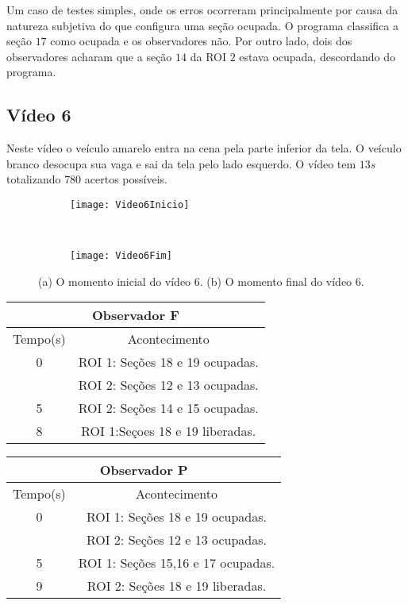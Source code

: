 Um caso de testes simples, onde os erros ocorreram principalmente por causa da natureza subjetiva do que configura uma seção ocupada. O programa classifica a seção $17$ como ocupada e os observadores não. Por outro lado, dois dos observadores acharam que a seção $14$ da ROI $2$ estava ocupada, descordando do programa.

\subsection{Vídeo 6}

Neste vídeo o veículo amarelo entra na cena pela parte inferior da tela. O veículo branco desocupa sua vaga e sai da tela pelo lado esquerdo. O vídeo tem $13s$ totalizando $780$ acertos possíveis.

\begin{figure}[!h]
\centering
\begin{subfigure}{.5\textwidth}
\centering
\texttt{[image: Video6Inicio]}
\caption{}
\end{subfigure}\
\begin{subfigure}{.5\textwidth}
\centering
\texttt{[image: Video6Fim]}
\caption{}
\end{subfigure}
\centering
\caption{(a) O momento inicial do vídeo 6. (b) O momento final do vídeo 6.}%
\label{}%
\end{figure}

\begin{center}
\begin{tabular}{|c||c|}
\hline
\multicolumn{2}{|c|}{Observador F}  \\ \hline \hline
Tempo(s) & Acontecimento \\ \hline
0 & ROI 1: Seções 18 e 19 ocupadas. \\
 & ROI 2: Seções 12 e 13 ocupadas. \\ \hline
5 & ROI 2: Seções 14 e 15 ocupadas. \\ \hline
8 & ROI 1:Seçoes 18 e 19 liberadas. \\
\hline
\end{tabular}
\end{center}

\begin{center}
\begin{tabular}{|c||c|}
\hline
\multicolumn{2}{|c|}{Observador P}  \\ \hline \hline
Tempo(s) & Acontecimento \\ \hline
0 & ROI 1: Seções 18 e 19 ocupadas. \\
 & ROI 2: Seções 12 e 13 ocupadas. \\ \hline
5 & ROI 1: Seções 15,16 e 17 ocupadas. \\ \hline
9 & ROI 2: Seções 18 e 19 liberadas. \\
\hline
\end{tabular}
\end{center}

